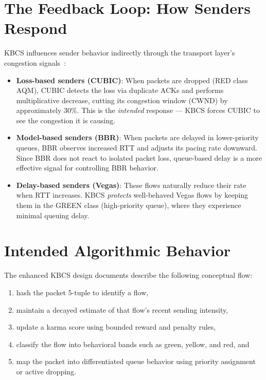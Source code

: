 \documentclass[12pt,a4paper]{report}
\begin{document}
\section{The Feedback Loop: How Senders Respond}
KBCS influences sender behavior indirectly through the transport layer's congestion signals~\cite{kbcs_design}:

\begin{itemize}
    \item \textbf{Loss-based senders (CUBIC)}: When packets are dropped (RED class AQM), CUBIC detects the loss via duplicate ACKs and performs multiplicative decrease, cutting its congestion window (CWND) by approximately $30\%$. This is the \textit{intended} response — KBCS forces CUBIC to see the congestion it is causing.
    
    \item \textbf{Model-based senders (BBR)}: When packets are delayed in lower-priority queues, BBR observes increased RTT and adjusts its pacing rate downward. Since BBR does not react to isolated packet loss, queue-based delay is a more effective signal for controlling BBR behavior.
    
    \item \textbf{Delay-based senders (Vegas)}: These flows naturally reduce their rate when RTT increases. KBCS \textit{protects} well-behaved Vegas flows by keeping them in the GREEN class (high-priority queue), where they experience minimal queuing delay.
\end{itemize}

\section{Intended Algorithmic Behavior}
The enhanced KBCS design documents describe the following conceptual flow:
\begin{enumerate}
    \item hash the packet 5-tuple to identify a flow,
    \item maintain a decayed estimate of that flow's recent sending intensity,
    \item update a karma score using bounded reward and penalty rules,
    \item classify the flow into behavioral bands such as green, yellow, and red, and
    \item map the packet into differentiated queue behavior using priority assignment or active dropping.
\end{enumerate}
\end{document}
